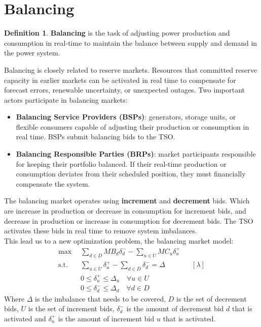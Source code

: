 \documentclass[12pt, openany]{report}
\theoremstyle{definition}
\newtheorem{definition}[thm]{Definition}
\begin{document}
\section{Balancing}
\begin{definition}
    \textbf{Balancing} is the task of adjusting power production and consumption in real-time to maintain the balance between supply and demand in the power system.
\end{definition}
Balancing is closely related to reserve markets. Resources that committed reserve capacity in earlier markets can be activated in real time to compensate for forecast errors, renewable uncertainty, or unexpected outages. Two important actors participate in balancing markets:
\begin{itemize}
    \item \textbf{Balancing Service Providers (BSPs)}: generators, storage units, or flexible consumers capable of adjusting their production or consumption in real time. BSPs submit balancing bids to the TSO.
    \item \textbf{Balancing Responsible Parties (BRPs)}: market participants responsible for keeping their portfolio balanced. If their real-time production or consumption deviates from their scheduled position, they must financially compensate the system.
\end{itemize}
The balancing market operates using \textbf{increment} and \textbf{decrement} bids. Which are increase in production or decrease in consumption for increment bids, and decrease in production or increase in consumption for decrement bids. The TSO activates these bids in real time to remove system imbalances.\\
This lead us to a new optimization problem, the balancing market model:
\begin{equation}
    \begin{aligned}
        \max & \sum_{d \in D} MB_d \delta_d^- - \sum_{u \in U} MC_u \delta_u^+ &&\\
        \text{s.t.} \quad & \sum_{u \in U} \delta_u^+ - \sum_{d \in D} \delta_d^- = \Delta &&[\lambda]\\
        & 0 \leq \delta_u^+ \leq \Delta_u \quad \forall u \in U\\
        & 0 \leq \delta_d^- \leq \Delta_d \quad \forall d \in D
    \end{aligned}
\end{equation}
Where $\Delta$ is the imbalance that needs to be covered, $D$ is the set of decrement bids, $U$ is the set of increment bids, $\delta_d^-$ is the amount of decrement bid $d$ that is activated and $\delta_u^+$ is the amount of increment bid $u$ that is activated.\\
\end{document}
